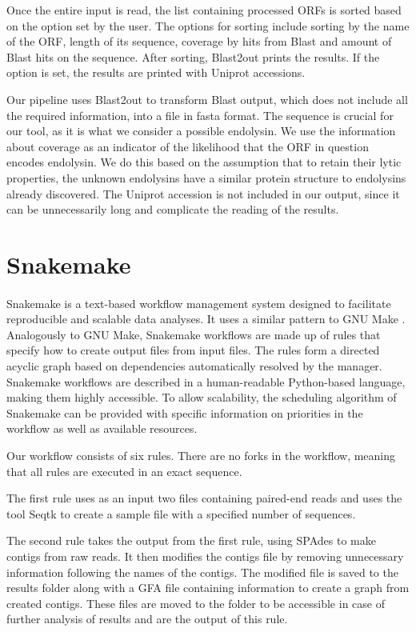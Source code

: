 Once the entire input is read, the list containing processed ORFs is sorted based on the option set by the user. The options for sorting include sorting by the name of the ORF, length of its sequence, coverage by hits from Blast and amount of Blast hits on the sequence. After sorting, Blast2out prints the results. If the option is set, the results are printed with Uniprot accessions.

Our pipeline uses Blast2out to transform Blast output, which does not include all the required information, into a file in fasta format. The sequence is crucial for our tool, as it is what we consider a possible endolysin. We use the information about coverage as an indicator of the likelihood that the ORF in question encodes endolysin. We do this based on the assumption that to retain their lytic properties, the unknown endolysins have a similar protein structure to endolysins already discovered. The Uniprot accession is not included in our output, since it can be unnecessarily long and complicate the reading of the results.

\section{Snakemake}
\paragraph*{}
Snakemake\cite{koster2012snakemake} is a text-based workflow management system designed to facilitate reproducible and scalable data analyses. It uses a similar pattern to GNU Make \cite{stallman1991gnu}. Analogously to GNU Make, Snakemake workflows are made up of rules that specify how to create output files from input files. The rules form a directed acyclic graph based on dependencies automatically resolved by the manager. Snakemake workflows are described in a human-readable Python-based language, making them highly accessible. To allow scalability, the scheduling algorithm of Snakemake can be provided with specific information on priorities in the workflow as well as available resources.

Our workflow consists of six rules. There are no forks in the workflow, meaning that all rules are executed in an exact sequence.

The first rule uses as an input two files containing paired-end reads and uses the tool Seqtk to create a sample file with a specified number of sequences.

The second rule takes the output from the first rule, using SPAdes to make contigs from raw reads. It then modifies the contigs file by removing unnecessary information following the names of the contigs. The modified file is saved to the results folder along with a GFA file containing information to create a graph from created contigs. These files are moved to the folder to be accessible in case of further analysis of results and are the output of this rule.

